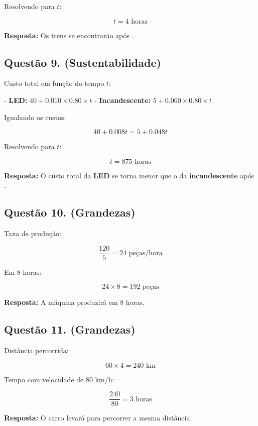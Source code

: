 \documentclass[11pt]{article}
\begin{document}
\begin{multicols}{2}
Resolvendo para \(t\):

\[
t = 4 \text{ horas}
\]

\textbf{Resposta:} Os trens se encontrarão após .



\subsection*{Questão 9. (Sustentabilidade)}
Custo total em função do tempo \(t\):

- \textbf{LED:} \(40 + 0.010 \times 0.80 \times t\)
- \textbf{Incandescente:} \(5 + 0.060 \times 0.80 \times t\)

Igualando os custos:

\[
40 + 0.008t = 5 + 0.048t
\]

Resolvendo para \(t\):

\[
t = 875 \text{ horas}
\]

\textbf{Resposta:} O custo total da \textbf{LED} se torna menor que o da \textbf{incandescente} após .



\subsection*{Questão 10. (Grandezas)}
Taxa de produção:

\[
\frac{120}{5} = 24 \text{ peças/hora}
\]

Em 8 horas:

\[
24 \times 8 = 192 \text{ peças}
\]

\textbf{Resposta:} A máquina produzirá  em 8 horas.



\subsection*{Questão 11. (Grandezas)}
Distância percorrida:

\[
60 \times 4 = 240 \text{ km}
\]

Tempo com velocidade de 80 km/h:

\[
\frac{240}{80} = 3 \text{ horas}
\]

\textbf{Resposta:} O carro levará  para percorrer a mesma distância.

\end{multicols}
\end{document}
